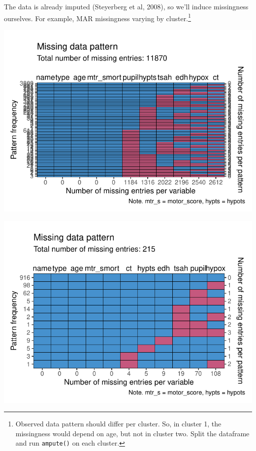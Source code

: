 \documentclass[
]{jss}
\begin{document}
The data is already imputed (Steyerberg et al, 2008), so we'll induce
missingness ourselves. For example, MAR missingness varying by
cluster.\footnote{Observed data pattern should differ per cluster. So,
  in cluster 1, the missingness would depend on age, but not in cluster
  two. Split the dataframe and run \texttt{ampute()} on each cluster.}

\begin{CodeChunk}


\begin{center}\includegraphics{Manuscript_files/figure-latex/impact-1} \end{center}



\begin{center}\includegraphics{Manuscript_files/figure-latex/impact-2} \end{center}




\end{CodeChunk}
\end{document}
